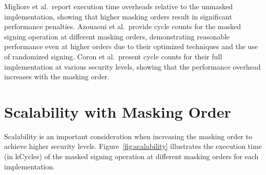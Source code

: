Migliore et al.\ report execution time overheads relative to the unmasked implementation, showing that higher masking orders result in significant performance penalties. Azouaoui et al.\ provide cycle counts for the masked signing operation at different masking orders, demonstrating reasonable performance even at higher orders due to their optimized techniques and the use of randomized signing. Coron et al.\ present cycle counts for their full implementation at various security levels, showing that the performance overhead increases with the masking order.

\section{Scalability with Masking Order}

Scalability is an important consideration when increasing the masking order to achieve higher security levels. Figure~\ref{fig:scalability} illustrates the execution time (in kCycles) of the masked signing operation at different masking orders for each implementation.

